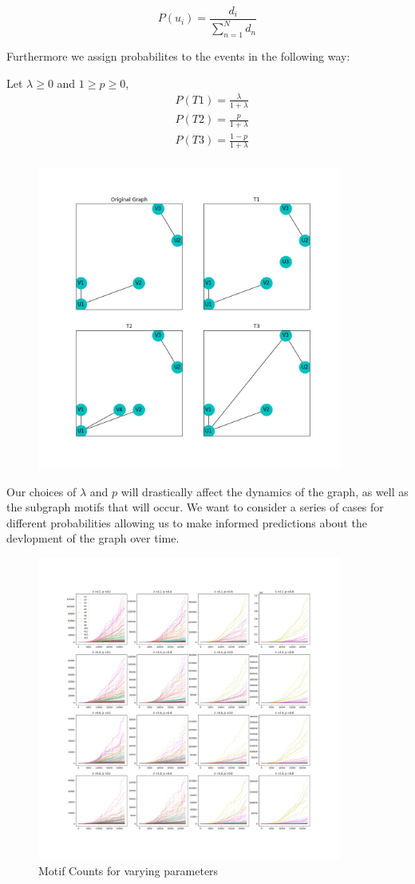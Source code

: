 $$
P(u_i) = \frac{d_i}{\sum^{N}_{n=1} d_n}
$$

Furthermore we assign probabilites to the events in the following way:

Let $\lambda \geq 0$ and $1 \geq p \geq 0$,
\begin{align*}
    &P(T1) = \frac{\lambda}{1 + \lambda} \\
    &P(T2) = \frac{p}{1 + \lambda} \\
    &P(T3) = \frac{1-p}{1 + \lambda} \\
\end{align*}


\begin{figure}
    \includegraphics[width=10cm]{Images/events.png}\
    \centering
\end{figure}
\vspace{3mm}

Our choices of $\lambda$ and $p$ will drastically affect the dynamics of the graph, as well as the subgraph motifs that will
occur. We want to consider a series of cases for different probabilities allowing us to make informed predictions about the devlopment
of the graph over time.

\begin{figure}[h!]
    \includegraphics[width=10cm]{Images/full-sims-graph_mid_set.png}
    \centering
    \caption{Motif Counts for varying parameters}
\end{figure}
\newpage

